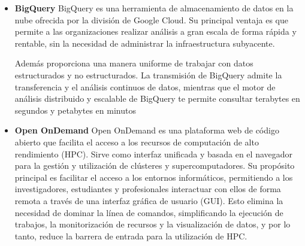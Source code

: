 \begin{itemize}
    \item \textbf{BigQuery} \newline
    BigQuery es una herramienta de almacenamiento de datos en la nube ofrecida por la división de Google Cloud. Su principal ventaja es que permite a las 
    organizaciones realizar análisis a gran escala de forma rápida y rentable, sin la necesidad de administrar la infraestructura subyacente.

    Además proporciona una manera uniforme de trabajar con datos estructurados y no estructurados. La transmisión de BigQuery admite la transferencia y 
    el análisis continuos de datos, mientras que el motor de análisis distribuido y escalable de BigQuery te permite consultar terabytes en segundos y petabytes en minutos

    
    \item \textbf{Open OnDemand} \newline
    Open OnDemand es una plataforma web de código abierto que facilita el acceso a los recursos de computación de alto rendimiento (HPC). Sirve como interfaz unificada 
    y basada en el navegador para la gestión y utilización de clústeres y supercomputadores. Su propósito principal es facilitar el acceso a los entornos informáticos, 
    permitiendo a los investigadores, estudiantes y profesionales interactuar con ellos de forma remota a través de una interfaz gráfica de usuario (GUI). Esto elimina la 
    necesidad de dominar la línea de comandos, simplificando la ejecución de trabajos, la monitorización de recursos y la visualización de datos, y por lo tanto, reduce la 
    barrera de entrada para la utilización de HPC.
\end{itemize}